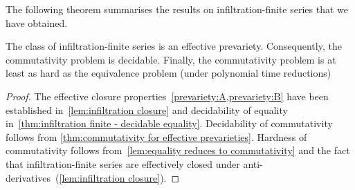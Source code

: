 The following theorem summarises the results on infiltration-finite series that we have obtained.
%
\begin{theorem}
    \label{thm:infiltration finite - effective prevariety}
    The class of infiltration-finite series is an effective prevariety.
    Consequently, the commutativity problem is decidable.
    Finally, the commutativity problem is at least as hard as the equivalence problem (under polynomial time reductions)
\end{theorem}
%
\begin{proof}
    The effective closure properties~\cref{prevariety:A,prevariety:B} 
    have been established in~\cref{lem:infiltration closure}
    and decidability of equality in~\cref{thm:infiltration finite - decidable equality}.
    Decidability of commutativity follows from \cref{thm:commutativity for effective prevarieties}.
    Hardness of commutativity follows from~\cref{lem:equality reduces to commutativity}
    and the fact that infiltration-finite series are effectively closed under anti-derivatives~(\cref{lem:infiltration closure}).
\end{proof}
